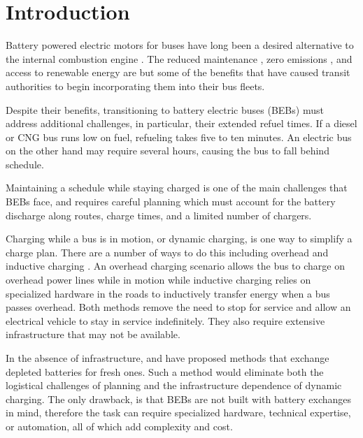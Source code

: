 \section{Introduction}
\par  Battery powered electric motors for buses have long been a desired alternative to the internal combustion engine \cite{Mahmoud2016}. The reduced maintenance \cite{poornesh_comparative_2020}, zero emissions \cite{kato_comparative_2013}, and access to renewable energy \cite{cheng_smart_2020} are but some of the benefits that have caused transit authorities to begin incorporating them into their bus fleets.  
\par Despite their benefits, transitioning to battery electric buses (BEBs) must address additional challenges, in particular, their extended refuel times. If a diesel or CNG bus runs low on fuel, refueling takes five to ten minutes.  An electric bus on the other hand may require several hours, causing the bus to fall behind schedule.
\par Maintaining a schedule while staying charged is one of the main challenges that BEBs face, and requires careful planning which must account for the battery discharge along routes, charge times, and a limited number of chargers. 
\par Charging while a bus is in motion, or dynamic charging, is one way to simplify a charge plan. There are a number of ways to do this including overhead \cite{csonka_optimization_2021} and inductive charging \cite{jeong_automatic_2018} \cite{balde_electric_2019}. An overhead charging scenario allows the bus to charge on overhead power lines while in motion while inductive charging relies on specialized hardware in the roads to inductively transfer energy when a bus passes overhead. Both methods remove the need to stop for service and allow an electrical vehicle to stay in service indefinitely. They also require extensive infrastructure \cite{Alwesabi_2022_Robust} that may not be available.
\par In the absence of infrastructure, \cite{jain_battery_2020} and \cite{xian_zhang_optimal_2016} have proposed methods that exchange depleted batteries for fresh ones. Such a method would eliminate both the logistical challenges of planning and the infrastructure dependence of dynamic charging. The only drawback, is that BEBs are not built with battery exchanges in mind, therefore the task can require specialized hardware, technical expertise, or automation, all of which add complexity and cost.

